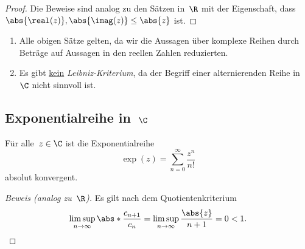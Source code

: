 \documentclass[a4paper]{article}
\begin{document}
\begin{proof}
    Die Beweise sind analog zu den Sätzen in~$\R$ mit der Eigenschaft, dass $\abs{\real(z)}, \abs{\imag(z)} \leq \abs{z}$ ist.
\end{proof}

\begin{remark}\leavevmode
    \begin{enumerate}
        \item Alle obigen Sätze gelten, da wir die Aussagen über komplexe Reihen durch Beträge auf Aussagen in den reellen Zahlen reduzierten.
        \item Es gibt \underline{kein} \emph{Leibniz-Kriterium}, da der Begriff einer alternierenden Reihe in~$\C$ nicht sinnvoll ist.
    \end{enumerate}
\end{remark}

\subsection{Exponentialreihe in~\texorpdfstring{$\C$}{C}}

\begin{theorem}
    Für alle~$z \in \C$ ist die Exponentialreihe
    \begin{equation*}
        \exp(z) = \sum_{n=0}^\infty \frac{z^n}{n!}
    \end{equation*}
    absolut konvergent.
\end{theorem}

\begin{proof}[Beweis (analog zu~$\R$)]
    Es gilt nach dem Quotientenkriterium
    \begin{equation*}
        \limsup_{n\to\infty} \abs*{\frac{c_{n+1}}{c_n}} = \limsup_{n\to\infty} \frac{\abs{z}}{n+1} = 0 < 1. \qedhere
    \end{equation*}
\end{proof}
\end{document}

